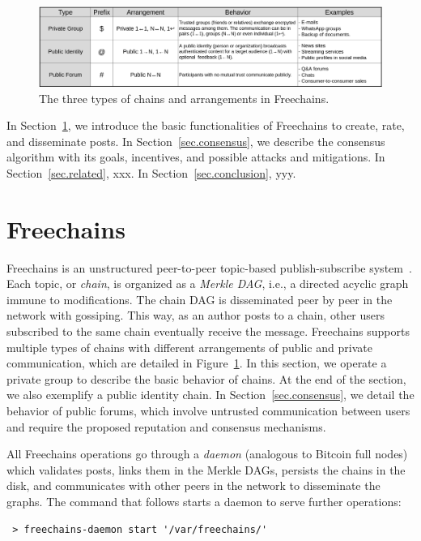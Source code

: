 \documentclass[10pt,journal,compsoc]{IEEEtran}
\newcommand{\FC}       {Freechains\xspace}
\begin{document}
\begin{figure}[ht]
\centering
\includegraphics[width=\textwidth]{arrangements.png}
\caption{The three types of chains and arrangements in \FC.}
\label{fig.table}
\end{figure}

In Section~\ref{sec.freechains}, we introduce the basic functionalities of \FC
to create, rate, and disseminate posts.
In Section~\ref{sec.consensus}, we describe the consensus algorithm with its
goals, incentives, and possible attacks and mitigations.
In Section~\ref{sec.related}, xxx.
In Section~\ref{sec.conclusion}, yyy.

\section{Freechains}
\label{sec.freechains}

\FC is an unstructured peer-to-peer topic-based publish-subscribe
system~\cite{fcs.sbseg20}.
Each topic, or \emph{chain}, is organized as a \emph{Merkle DAG}, i.e., a
directed acyclic graph immune to modifications.
The chain DAG is disseminated peer by peer in the network with gossiping.
This way, as an author posts to a chain, other users subscribed to the same
chain eventually receive the message.
\FC supports multiple types of chains with different arrangements of public and
private communication, which are detailed in Figure~\ref{fig.table}.
In this section, we operate a private group to describe the basic behavior of
chains.
At the end of the section, we also exemplify a public identity chain.
In Section~\ref{sec.consensus}, we detail the behavior of public forums, which
involve untrusted communication between users and require the proposed
reputation and consensus mechanisms.

All \FC operations go through a \emph{daemon} (analogous to Bitcoin full nodes)
which validates posts, links them in the Merkle DAGs, persists the chains in
the disk, and communicates with other peers in the network to disseminate the
graphs.
The command that follows starts a daemon to serve further operations:

{\footnotesize
\begin{verbatim}
 > freechains-daemon start '/var/freechains/'
\end{verbatim}
}
\end{document}
